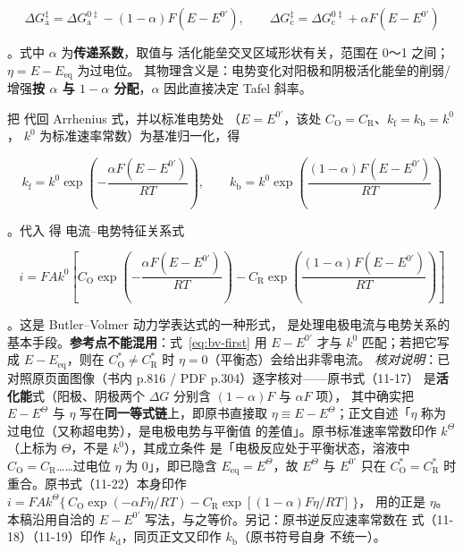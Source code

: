 \begin{equation}
\Delta G_{\mathrm{a}}^\ddagger=\Delta G_{\mathrm{a}}^{0\ddagger}-(1-\alpha)F(E-E^{0'}),
\qquad
\Delta G_{\mathrm{c}}^\ddagger=\Delta G_{\mathrm{c}}^{0\ddagger}+\alpha F(E-E^{0'})
\label{eq:dg-eta}
\end{equation}

。式中 $\alpha$ 为\textbf{传递系数}，取值与
活化能垒交叉区域形状有关，范围在 0～1 之间；$\eta=E-E_{\mathrm{eq}}$ 为过电位。
其物理含义是：电势变化对阳极和阴极活化能垒的削弱/增强\textbf{按 $\alpha$ 与
$1-\alpha$ 分配}，$\alpha$ 因此直接决定 Tafel 斜率。

把  代回 Arrhenius 式，并以标准电势处
（$E=E^{0'}$，该处 $C_{\mathrm{O}}=C_{\mathrm{R}}$、$k_{\mathrm{f}}=k_{\mathrm{b}}=k^0$，
$k^0$ 为标准速率常数）为基准归一化，得

\begin{equation}
k_{\mathrm{f}}=k^0\exp\!\left(-\frac{\alpha F(E-E^{0'})}{RT}\right),
\qquad
k_{\mathrm{b}}=k^0\exp\!\left(\frac{(1-\alpha)F(E-E^{0'})}{RT}\right)
\label{eq:k-eta}
\end{equation}

。代入  得
电流--电势特征关系式

\begin{equation}
i=FAk^0\left[C_{\mathrm{O}}\exp\!\left(-\frac{\alpha F(E-E^{0'})}{RT}\right)
-C_{\mathrm{R}}\exp\!\left(\frac{(1-\alpha)F(E-E^{0'})}{RT}\right)\right]
\label{eq:bv-first}
\end{equation}

。这是 Butler--Volmer 动力学表达式的一种形式，
是处理电极电流与电势关系的基本手段。\textbf{参考点不能混用}：式~\eqref{eq:bv-first}
用 $E-E^{0'}$ 才与 $k^0$ 匹配；若把它写成 $E-E_{\mathrm{eq}}$，则在
$C_{\mathrm{O}}^*\neq C_{\mathrm{R}}^*$ 时 $\eta=0$（平衡态）会给出非零电流。
\emph{核对说明}：已对照原页面图像（书内 p.816 / PDF p.304）逐字核对——原书式（11-17）
是\textbf{活化能}式（阳极、阴极两个 $\Delta G$ 分别含 $(1-\alpha)F$ 与 $\alpha F$ 项），
其中确实把 $E-E^{\Theta}$ 与 $\eta$ 写在\textbf{同一等式链}上，即原书直接取
$\eta\equiv E-E^{\Theta}$；正文自述「$\eta$ 称为过电位（又称超电势），是电极电势与平衡值
的差值」。原书标准速率常数印作 $k^{\Theta}$（上标为 $\Theta$，不是 $k^{0}$），其成立条件
是「电极反应处于平衡状态，溶液中 $C_{\mathrm{O}}=C_{\mathrm{R}}$……过电位 $\eta$ 为
$0$」，即已隐含 $E_{\mathrm{eq}}=E^{\Theta}$，故 $E^{\Theta}$ 与 $E^{0'}$ 只在
$C_{\mathrm{O}}^*=C_{\mathrm{R}}^*$ 时重合。原书式（11-22）本身印作
$i=FAk^{\Theta}\{\,C_{\mathrm{O}}\exp(-\alpha F\eta/RT)-C_{\mathrm{R}}\exp[(1-\alpha)F\eta/RT]\,\}$，
用的正是 $\eta$。本稿沿用自洽的 $E-E^{0'}$ 写法，与之等价。另记：原书逆反应速率常数在
式（11-18）（11-19）印作 $k_{\mathrm{d}}$，同页正文又印作 $k_{\mathrm{b}}$（原书符号自身
不统一）。

